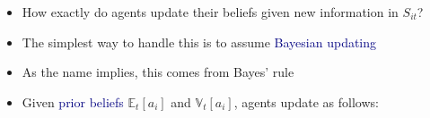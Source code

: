 \documentclass[aspectratio=169]{beamer}
\begin{document}
\begin{frame}

\begin{itemize}
\itemsep1.5em
\item<1-> How exactly do agents update their beliefs given new information in $S_{it}$?
\item<2-> The simplest way to handle this is to assume \textcolor{navy}{Bayesian updating}
\item<3-> As the name implies, this comes from Bayes' rule
\item<4-> Given \textcolor{navy}{prior beliefs} $\mathbb{E}_t[a_i]$ and $\mathbb{V}_t[a_i]$, agents update as follows:
\end{itemize}



\end{frame}
\end{document}
